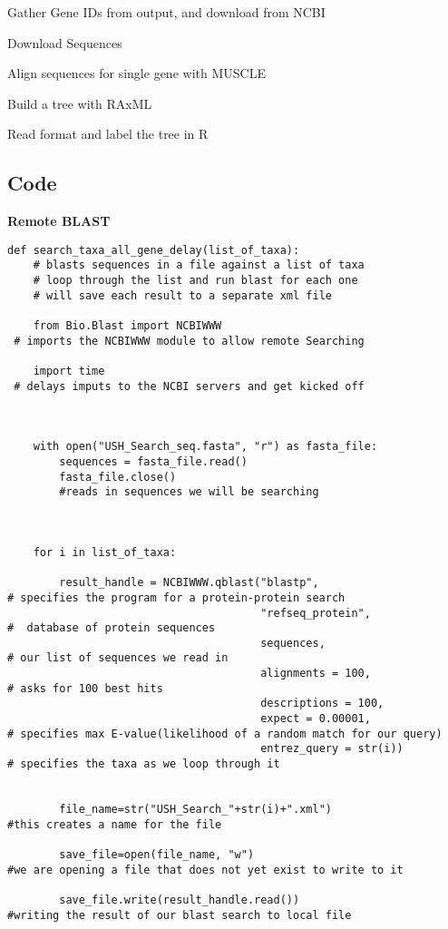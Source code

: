 \documentclass[12pt]{article}
\begin{document}
Gather Gene IDs from output, and download from NCBI
  
Download Sequences

Align sequences for single gene with MUSCLE

Build a tree with RAxML
  
Read format and label the tree in R

\subsection{Code}
\textbf{Remote BLAST}
\begin{lstlisting}
def search_taxa_all_gene_delay(list_of_taxa):
    # blasts sequences in a file against a list of taxa
    # loop through the list and run blast for each one
    # will save each result to a separate xml file

    from Bio.Blast import NCBIWWW
 # imports the NCBIWWW module to allow remote Searching

    import time
 # delays imputs to the NCBI servers and get kicked off

    

    with open("USH_Search_seq.fasta", "r") as fasta_file:
        sequences = fasta_file.read()
        fasta_file.close()
        #reads in sequences we will be searching

        

    for i in list_of_taxa:

        result_handle = NCBIWWW.qblast("blastp", 
# specifies the program for a protein-protein search
                                       "refseq_protein",  
#  database of protein sequences
                                       sequences, 
# our list of sequences we read in
                                       alignments = 100, 
# asks for 100 best hits
                                       descriptions = 100, 
                                       expect = 0.00001, 
# specifies max E-value(likelihood of a random match for our query)
                                       entrez_query = str(i)) 
# specifies the taxa as we loop through it

                                       
        file_name=str("USH_Search_"+str(i)+".xml") 
#this creates a name for the file

        save_file=open(file_name, "w")  
#we are opening a file that does not yet exist to write to it        

        save_file.write(result_handle.read())  
#writing the result of our blast search to local file
        

\end{lstlisting}
\end{document}
